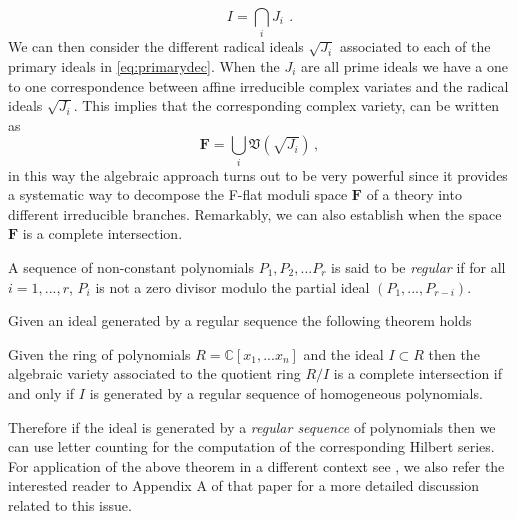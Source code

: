 \documentclass[main.tex]{subfiles}
\begin{document}
\begin{equation}
\label{eq:primarydec}
	I = \bigcap\limits_{i}J_{i}\, \ . 
\end{equation}
We can then consider the different radical ideals $\sqrt{J_i}$ associated to each of the primary ideals in \eqref{eq:primarydec}. When the $J_i$ are all prime ideals we have a one to one correspondence between affine irreducible complex variates and the radical ideals $\sqrt{J_i}$. This implies that the corresponding complex variety, can be written as
\begin{equation}
\label{eq:fdec}
\mathbf{F} = \bigcup_{i} \mathfrak{V}(\sqrt{J_i})\, ,
\end{equation}
in this way the algebraic approach turns out to be very powerful since it provides a systematic way to decompose the F-flat moduli space $\mathbf{F}$ of a theory into different irreducible branches.
Remarkably, we can also establish when the space $\mathbf{F}$ is a complete intersection. 
\begin{definition}\label{def:regseq}
A sequence of non-constant polynomials \newline$P_1,P_2,...P_r$ is said to be \textit{regular} if for all $i=1,...,r$, $P_i$ is not a zero divisor modulo the partial ideal $(P_1,...,P_{r-i})$.
\end{definition}
Given an ideal generated by a regular sequence the following theorem holds \cite{stanley1978hilbert}  
\begin{theorem}
Given the ring of polynomials $R=\mathbb{C}[x_1,...x_n]$ and the ideal $I \subset R$ then the algebraic variety associated to the quotient ring $R/I$ is a complete intersection if and only if $I$ is generated by a regular sequence of homogeneous polynomials.
\end{theorem}
Therefore if the ideal is generated by a \textit{regular sequence} of polynomials then we can use letter counting for the computation of the corresponding Hilbert series. For application of the above theorem in a different context see \cite{Bourget:2017sxr}, we also refer the interested reader to Appendix A of that paper for a more detailed discussion related to this issue.
\end{document}
